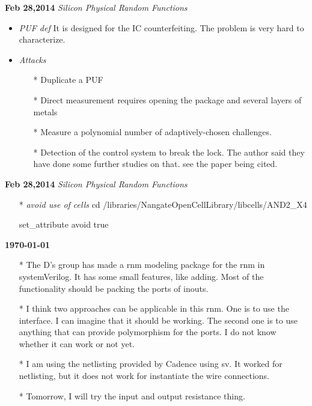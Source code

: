 \documentclass[]{article}
\begin{document}
\noindent \textbf{Feb 28,2014}
\textit{Silicon Physical Random Functions}
\indent		\begin{itemize}
                \item \textit{PUF def} It is designed for the IC counterfeiting.
                The problem is very hard to characterize.
                \item \textit{Attacks}
                    \begin{itemize}
                        \item [*] Duplicate a PUF
                        \item [*] Direct measurement requires opening the
                        package and several layers of metals
                        \item [*] Measure a polynomial number of
                        adaptively-chosen challenges.
                        \item [*] Detection of the control system to break the
                        lock. The author said they have done some further
                        studies on that. see the paper being cited.
                    \end{itemize}
        \end{itemize}

\noindent \textbf{Feb 28,2014}
\textit{Silicon Physical Random Functions}
\indent		\begin{itemize}
            \item [*] \textit{avoid use of cells} cd
            /libraries/NangateOpenCellLibrary/libcells/AND2\_X4

                                            set\_attribute avoid true
        \end{itemize}

\noindent\textbf{\today}
\begin{itemize}
    \item [*] The D's group has made a rnm modeling package for the rnm in
    systemVerilog. It has some small features, like adding. Most of the
    functionality should be packing the ports of inouts.
    \item [*] I think two approaches can be applicable in this rnm. One is to
    use the interface. I can imagine that it should be working. The second one
    is to use anything that can provide polymorphism for the ports. I do not
    know whether it can work or not yet.
    \item [*] I am using the netlisting provided by Cadence using sv. It worked
    for netlisting, but it does not work for instantiate the wire connections.
    \item [*] Tomorrow, I will try the input and output resistance thing.
\end{itemize}
\end{document}
